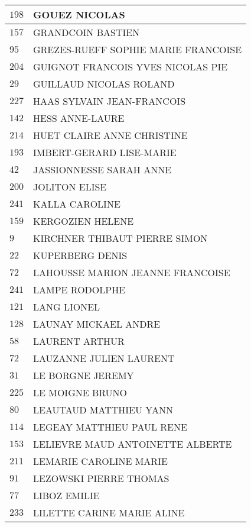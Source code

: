 \begin{xltabular}{\linewidth}{|l|X|}
    $198$ & GOUEZ NICOLAS \\
    \hline
    $157$ & GRANDCOIN BASTIEN \\
    \hline
    $95$ & GREZES-RUEFF SOPHIE MARIE FRANCOISE \\
    \hline
    $204$ & GUIGNOT FRANCOIS YVES NICOLAS PIE \\
    \hline
    $29$ & GUILLAUD NICOLAS ROLAND \\
    \hline
    $227$ & HAAS SYLVAIN JEAN-FRANCOIS \\
    \hline
    $142$ & HESS ANNE-LAURE \\
    \hline
    $214$ & HUET CLAIRE ANNE CHRISTINE \\
    \hline
    $193$ & IMBERT-GERARD LISE-MARIE \\
    \hline
    $42$ & JASSIONNESSE SARAH ANNE \\
    \hline
    $200$ & JOLITON ELISE \\
    \hline
    $241$ & KALLA CAROLINE \\
    \hline
    $159$ & KERGOZIEN HELENE \\
    \hline
    $9$ & KIRCHNER THIBAUT PIERRE SIMON \\
    \hline
    $22$ & KUPERBERG DENIS \\
    \hline
    $72$ & LAHOUSSE MARION JEANNE FRANCOISE \\
    \hline
    $241$ & LAMPE RODOLPHE \\
    \hline
    $121$ & LANG LIONEL \\
    \hline
    $128$ & LAUNAY MICKAEL ANDRE \\
    \hline
    $58$ & LAURENT ARTHUR \\
    \hline
    $72$ & LAUZANNE JULIEN LAURENT \\
    \hline
    $31$ & LE BORGNE JEREMY \\
    \hline
    $225$ & LE MOIGNE BRUNO \\
    \hline
    $80$ & LEAUTAUD MATTHIEU YANN \\
    \hline
    $114$ & LEGEAY MATTHIEU PAUL RENE \\
    \hline
    $153$ & LELIEVRE MAUD ANTOINETTE ALBERTE \\
    \hline
    $211$ & LEMARIE CAROLINE MARIE \\
    \hline
    $91$ & LEZOWSKI PIERRE THOMAS \\
    \hline
    $77$ & LIBOZ EMILIE \\
    \hline
    $233$ & LILETTE CARINE MARIE ALINE \\

\end{xltabular}
